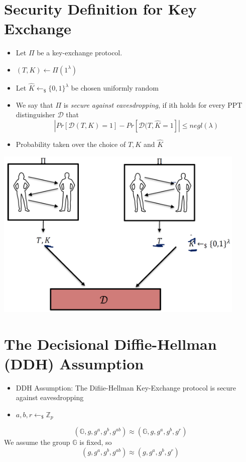 \section{Security Definition for Key Exchange}
	\begin{itemize}
		\item Let $\Pi$ be a key-exchange protocol.
		\item $(T,K) \leftarrow \Pi(1^{\lambda})$
		\item Let $\hat{K} \leftarrow_{\$} \{0,1\}^{\lambda}$ be chosen uniformly random
		\item We say that $\Pi$ is \textit{secure against eavesdropping}, if ith holds for every PPT distinguisher $\mathcal{D}$ that
		$$|Pr[\mathcal{D}(T,K) = 1] - Pr[\mathcal{D}(T,\hat{K} = 1]| \leq negl(\lambda)$$
		\item Probability taken over the choice of $T,K$ and $\hat{K}$
	\end{itemize}
	\begin{center}
		\includegraphics[width=120mm]{Graphics/Key Distribution and Key Exchange/kdke5.png}
	\end{center}

\section{The Decisional Diffie-Hellman (DDH) Assumption}
	\begin{itemize}
		\item DDH Assumption: The Difiie-Hellman Key-Exchange protocol is secure against eavesdropping
		\item $a,b,r \leftarrow_{\$} \mathbb{Z}_p$
	\end{itemize}
	$$(\mathbb{G},g,g^a,g^b,g^{ab}) \approx (\mathbb{G},g,g^a,g^b,g^r)$$
	We assume the group $\mathbb{G}$ is fixed, so
	$$(g,g^a,g^b,g^{ab}) \approx (g,g^a,g^b,g^r)$$

